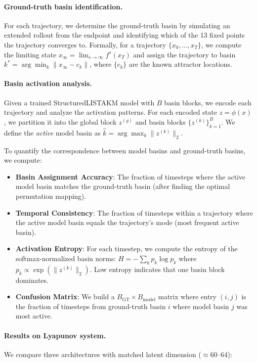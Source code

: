 \paragraph{Ground-truth basin identification.}
For each trajectory, we determine the ground-truth basin by simulating an extended rollout from the endpoint and identifying which of the 13 fixed points the trajectory converges to. Formally, for a trajectory $\{x_0, \ldots, x_T\}$, we compute the limiting state $x_\infty = \lim_{s \to \infty} f^s(x_T)$ and assign the trajectory to basin $k^* = \arg\min_k \|x_\infty - c_k\|$, where $\{c_k\}$ are the known attractor locations.

\paragraph{Basin activation analysis.}
Given a trained StructuredLISTAKM model with $B$ basin blocks, we encode each trajectory and analyze the activation patterns. For each encoded state $z = \phi(x)$, we partition it into the global block $z^{(g)}$ and basin blocks $\{z^{(k)}\}_{k=1}^B$. We define the \emph{active} model basin as $\hat{k} = \arg\max_k \|z^{(k)}\|_2$.

To quantify the correspondence between model basins and ground-truth basins, we compute:
\begin{itemize}
    \item \textbf{Basin Assignment Accuracy}: The fraction of timesteps where the active model basin matches the ground-truth basin (after finding the optimal permutation mapping).
    \item \textbf{Temporal Consistency}: The fraction of timesteps within a trajectory where the active model basin equals the trajectory's mode (most frequent active basin).
    \item \textbf{Activation Entropy}: For each timestep, we compute the entropy of the softmax-normalized basin norms: $H = -\sum_k p_k \log p_k$ where $p_k \propto \exp(\|z^{(k)}\|_2)$. Low entropy indicates that one basin block dominates.
    \item \textbf{Confusion Matrix}: We build a $B_{\text{GT}} \times B_{\text{model}}$ matrix where entry $(i, j)$ is the fraction of timesteps from ground-truth basin $i$ where model basin $j$ was most active.
\end{itemize}

\paragraph{Results on Lyapunov system.}
We compare three architectures with matched latent dimension ($\approx$60--64):

